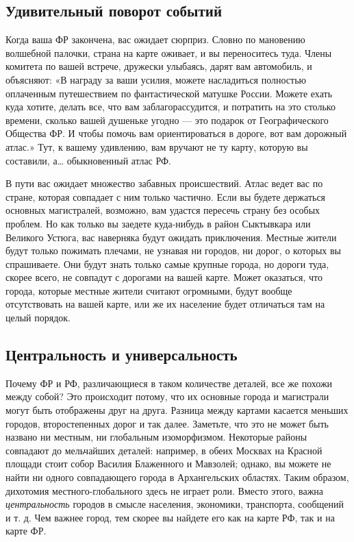 \documentclass[../main.tex]{subfiles}
\begin{document}
\subsection{Удивительный поворот событий}

Когда ваша ФР закончена, вас ожидает сюрприз. Словно по мановению волшебной палочки, страна на карте оживает, и вы переноситесь туда. Члены комитета по вашей встрече, дружески улыбаясь, дарят вам автомобиль, и объясняют: «В награду за ваши усилия, можете насладиться полностью оплаченным путешествием по фантастической матушке России. Можете ехать куда хотите, делать все, что вам заблагорассудится, и потратить на это столько времени, сколько вашей душеньке угодно --- это подарок от Географического Общества ФР. И чтобы помочь вам ориентироваться в дороге, вот вам дорожный атлас.» Тут, к вашему удивлению, вам вручают не ту карту, которую вы составили, а\ldots{} обыкновенный атлас РФ.

В пути вас ожидает множество забавных происшествий. Атлас ведет вас по стране, которая совпадает с ним только частично. Если вы будете держаться основных магистралей, возможно, вам удастся пересечь страну без особых проблем. Но как только вы заедете куда-нибудь в район Сыктывкара или Великого Устюга, вас наверняка будут ожидать приключения. Местные жители будут только пожимать плечами, не узнавая ни городов, ни дорог, о которых вы спрашиваете. Они будут знать только самые крупные города, но дороги туда, скорее всего, не совпадут с дорогами на вашей карте. Может оказаться, что города, которые местные жители считают огромными, будут вообще отсутствовать на вашей карте, или же их население будет отличаться там на целый порядок.


\subsection{Центральность и универсальность}

Почему ФР и РФ, различающиеся в таком количестве деталей, все же похожи между собой? Это происходит потому, что их основные города и магистрали могут быть отображены друг на друга. Разница между картами касается меньших городов, второстепенных дорог и так далее. Заметьте, что это не может быть названо ни местным, ни глобальным изоморфизмом. Некоторые районы совпадают до мельчайших деталей: например, в обеих Москвах на Красной площади стоит собор Василия Блаженного и Мавзолей; однако, вы можете не найти ни одного совпадающего города в Архангельских областях. Таким образом, дихотомия местного-глобального здесь не играет роли. Вместо этого, важна \emph{центральность} городов в смысле населения, экономики, транспорта, сообщений и т. д. Чем важнее город, тем скорее вы найдете его как на карте РФ, так и на карте ФР.
\end{document}
